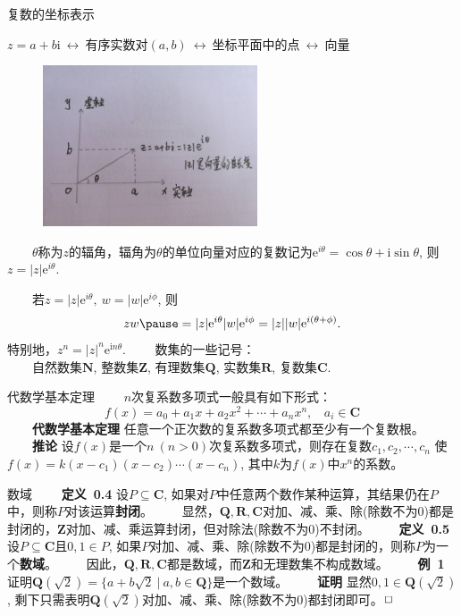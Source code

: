 \documentclass[compress,mathserif,cjk]{beamer}
\theoremstyle{remark}
\numberwithin{equation}{section}
\newcommand{\hei}{\bf}      %
\begin{document}
\begin{CJK}{UTF8}{gbsn}
\begin{frame}{复数的坐标表示}

 $z=a+b\mathrm i~\longleftrightarrow~\mbox{有序实数对}(a,b)~\longleftrightarrow~\mbox{坐标平面中的点}~\longleftrightarrow~\mbox{向量}$
 \pause
 \begin{figure}[!h]
  \centering
  \includegraphics[width=2.5in]{f0-1}
 \end{figure}
 \ \ \ \ $\theta$称为$z$的辐角，辐角为$\theta$的单位向量对应的复数记为$\mathrm e^{i\theta}=\cos\theta+\mathrm i\sin\theta$, 则$z=|z|\mathrm e^{i\theta}$.
\end{frame}

\begin{frame}
 \ \ \ \ 若$z=|z|\mathrm e^{i\theta},~w=|w|\mathrm e^{i\phi}$, 则
 $$zw\pause=|z|\mathrm e^{i\theta}|w|\mathrm e^{i\phi}=|z||w|\mathrm e^{i(\theta+\phi)}.$$
 特别地，$z^n=|z|^n\mathrm e^{\mathrm in\theta}$.
 \pause\vskip10pt
 \ \ \ \ 数集的一些记号：\\
 \ \ \ \ 自然数集$\mathbf N$, 整数集$\mathbf Z$, 有理数集$\mathbf Q$, 实数集$\mathbf R$, 复数集$\mathbf C$.


\end{frame}

\begin{frame}{代数学基本定理}
 \ \ \ \ $n$次复系数多项式一般具有如下形式：
 $$f(x)=a_0+a_1x+a_2x^2+\cdots+a_nx^n,~~~~a_i\in\mathbf C$$
 \pause\vskip5pt
 \ \ \ \ {\hei 代数学基本定理} 任意一个正次数的复系数多项式都至少有一个复数根。
 \pause\vskip15pt
 \ \ \ \ {\hei 推论} 设$f(x)$是一个$n~(n>0)$次复系数多项式，则存在复数$c_1,c_2,\cdots,c_n$ 使$f(x)=k(x-c_1)(x-c_2)\cdots(x-c_n)$, 其中$k$为$f(x)$中$x^n$的系数。
\end{frame}

\begin{frame}{数域}
 \ \ \ \ {\hei 定义~0.4} 设$P\subseteq\mathbf C$, 如果对$P$中任意两个数作某种运算，其结果仍在$P$中，则称$P$对该运算{\hei 封闭}。
 \pause\vskip10pt
 \ \ \ \ 显然，$\mathbf{Q,R,C}$对加、减、乘、除(除数不为0)都是封闭的，$\mathbf Z$对加、减、乘运算封闭，但对除法(除数不为0)不封闭。
  \pause\vskip10pt
  \ \ \ \ {\hei 定义~0.5} 设$P\subseteq\mathbf C$且$0,1\in P$, 如果$P$对加、减、乘、除(除数不为0)都是封闭的，则称$P$为一个{\hei 数域}。
  \pause\vskip10pt
  \ \ \ \ 因此，$\mathbf{Q,R,C}$都是数域，而$\mathbf Z$和无理数集不构成数域。
  \pause\vskip10pt
  \ \ \ \ {\hei 例~1} 证明$\mathbf Q(\sqrt{2})=\{a+b\sqrt2~|~a,b\in\mathbf Q\}$是一个数域。
  \pause\vskip10pt
  \ \ \ \ {\hei 证明} 显然$0,1\in\mathbf Q(\sqrt{2})$, 剩下只需表明$\mathbf Q(\sqrt2)$对加、减、乘、除(除数不为0)都封闭即可。$\hfill\Box$
\end{frame}


\end{CJK}
\end{document}
